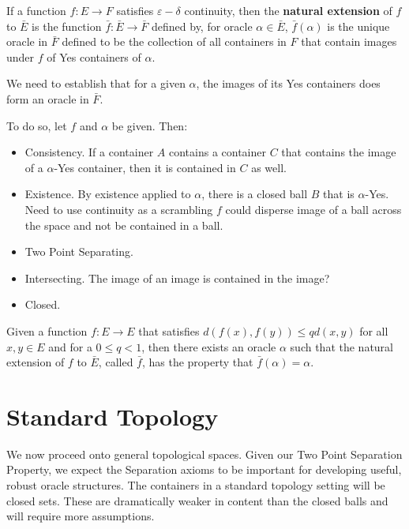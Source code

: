 \documentclass[12pt]{article}
\begin{document}
\begin{definition}
If a function $f:E \to F$ satisfies $\varepsilon-\delta$ continuity, then the \textbf{natural extension} of $f$ to $\bar{E}$ is the function $\bar{f}:\bar{E} \to \bar{F}$ defined by, for oracle $\alpha \in \bar{E}$, $\bar{f}(\alpha)$ is the unique oracle in $\bar{F}$ defined to be the collection of all containers in $F$ that contain images under $f$ of Yes containers of $\alpha$. 
\end{definition}

We need to establish that for a given $\alpha$, the images of its Yes containers does form an oracle in $\bar{F}$. 

To do so, let $f$ and $\alpha$ be given. Then: 

\begin{itemize}
    \item Consistency. If a container $A$ contains a container $C$ that contains the image of a $\alpha$-Yes container, then it is contained in $C$ as well.
    \item Existence. By existence applied to $\alpha$, there is a closed ball $B$ that is $\alpha$-Yes. Need to use continuity as a scrambling $f$ could disperse image of a ball across the space and not be contained in a ball. 
    \item Two Point Separating.
    \item Intersecting. The image of an image is contained in the image? 
    \item Closed. 
\end{itemize}

\begin{proposition}
    Given a function $f:E \to E$ that satisfies $d(f(x), f(y)) \leq q d(x, y)$ for all $x, y \in E$ and for a $0 \leq q < 1$, then there exists an oracle $\alpha$ such that the natural extension of $f$ to $\bar{E}$, called $\bar{f}$, has the property that $\bar{f}(\alpha) = \alpha$.
\end{proposition}



\section{Standard Topology}

We now proceed onto general topological spaces. Given our Two Point Separation Property, we expect the Separation axioms to be important for developing useful, robust oracle structures. The containers in a standard topology setting will be closed sets. These are dramatically weaker in content than the closed balls and will require more assumptions. 
\end{document}
